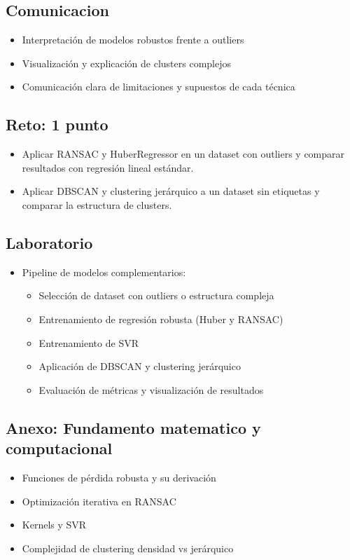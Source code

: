 \documentclass[12pt,a4paper,openany,oneside]{book}
\begin{document}
\begin{itemize}
\subsection{Comunicacion}
\begin{itemize}
    \item Interpretación de modelos robustos frente a outliers
    \item Visualización y explicación de clusters complejos
    \item Comunicación clara de limitaciones y supuestos de cada técnica
\end{itemize}

\subsection{Reto: 1 punto}
\begin{itemize}
    \item Aplicar RANSAC y HuberRegressor en un dataset con outliers y comparar resultados con regresión lineal estándar.
    \item Aplicar DBSCAN y clustering jerárquico a un dataset sin etiquetas y comparar la estructura de clusters.
\end{itemize}

\subsection{Laboratorio}
\begin{itemize}
    \item Pipeline de modelos complementarios:
    \begin{itemize}
        \item Selección de dataset con outliers o estructura compleja
        \item Entrenamiento de regresión robusta (Huber y RANSAC)
        \item Entrenamiento de SVR
        \item Aplicación de DBSCAN y clustering jerárquico
        \item Evaluación de métricas y visualización de resultados
    \end{itemize}
\end{itemize}

\subsection{Anexo: Fundamento matematico y computacional}
\begin{itemize}
    \item Funciones de pérdida robusta y su derivación
    \item Optimización iterativa en RANSAC
    \item Kernels y SVR
    \item Complejidad de clustering densidad vs jerárquico
\end{itemize}


\end{itemize}
\end{document}
